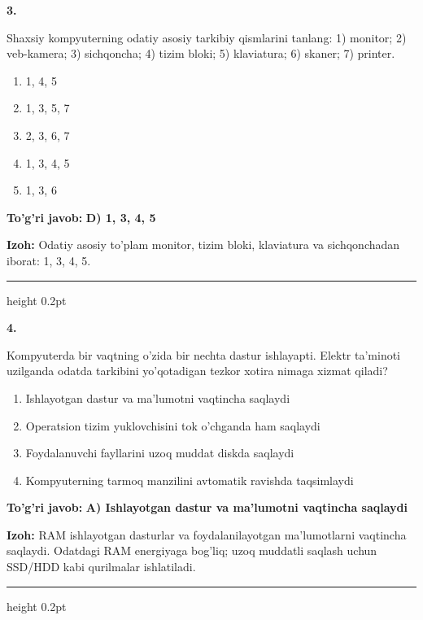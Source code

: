 \documentclass[10pt,a4paper]{article}
\begin{document}
{\bfseries\sffamily\color{ink} 3.}
\par
Shaxsiy kompyuterning odatiy asosiy tarkibiy qismlarini tanlang: 1) monitor; 2) veb-kamera; 3) sichqoncha; 4) tizim bloki; 5) klaviatura; 6) skaner; 7) printer.
\begin{enumerate}[label=\Alph*),leftmargin=9mm]
\item 1, 4, 5
\item 1, 3, 5, 7
\item 2, 3, 6, 7
\item 1, 3, 4, 5
\item 1, 3, 6
\end{enumerate}
\begin{tcolorbox}[enhanced,breakable,colback=teal!4,colframe=teal!60!black,boxrule=0.45pt,arc=1.2mm,left=2.7mm,right=2.7mm,top=1.8mm,bottom=1.8mm,before skip=2mm,after skip=2mm]
{\bfseries\sffamily\color{teal}To'g'ri javob:} \textbf{D) 1, 3, 4, 5}
\par\smallskip
{\bfseries Izoh:} Odatiy asosiy to'plam monitor, tizim bloki, klaviatura va sichqonchadan iborat: 1, 3, 4, 5.
\end{tcolorbox}
\vspace{2mm}\hrule height 0.2pt\vspace{3mm}

{\bfseries\sffamily\color{ink} 4.}
\par
Kompyuterda bir vaqtning o'zida bir nechta dastur ishlayapti. Elektr ta'minoti uzilganda odatda tarkibini yo'qotadigan tezkor xotira nimaga xizmat qiladi?
\begin{enumerate}[label=\Alph*),leftmargin=9mm]
\item Ishlayotgan dastur va ma'lumotni vaqtincha saqlaydi
\item Operatsion tizim yuklovchisini tok o'chganda ham saqlaydi
\item Foydalanuvchi fayllarini uzoq muddat diskda saqlaydi
\item Kompyuterning tarmoq manzilini avtomatik ravishda taqsimlaydi
\end{enumerate}
\begin{tcolorbox}[enhanced,breakable,colback=teal!4,colframe=teal!60!black,boxrule=0.45pt,arc=1.2mm,left=2.7mm,right=2.7mm,top=1.8mm,bottom=1.8mm,before skip=2mm,after skip=2mm]
{\bfseries\sffamily\color{teal}To'g'ri javob:} \textbf{A) Ishlayotgan dastur va ma'lumotni vaqtincha saqlaydi}
\par\smallskip
{\bfseries Izoh:} RAM ishlayotgan dasturlar va foydalanilayotgan ma'lumotlarni vaqtincha saqlaydi. Odatdagi RAM energiyaga bog'liq; uzoq muddatli saqlash uchun SSD/HDD kabi qurilmalar ishlatiladi.
\end{tcolorbox}
\vspace{2mm}\hrule height 0.2pt\vspace{3mm}
\end{document}
